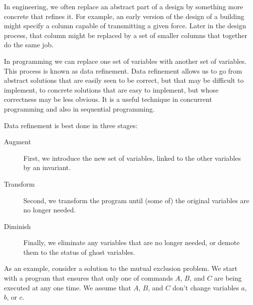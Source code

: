 \documentclass[muchmore,11pt]{article}%
\begin{document}
In engineering, we often replace an abstract part of a design by something
more concrete that refines it. For example, an early version of the design of
a building might specify a column capable of transmitting a given force. Later
in the design process, that column might be replaced by a set of smaller
columns that together do the same job.

In programming we can replace one set of variables with another set of
variables. This process is known as data refinement. Data refinement allows us
to go from abstract solutions that are easily seen to be correct, but that may
be difficult to implement, to concrete solutions that are easy to implement,
but whose correctness may be less obvious. It is a useful technique in
concurrent programming and also in sequential programming.

Data refinement is best done in three stages:

\begin{description}
\item[Augment] First, we introduce the new set of variables, linked to the
other variables by an invariant.

\item[Transform] Second, we transform the program until (some of) the original
variables are no longer needed.

\item[Diminish] Finally, we eliminate any variables that are no longer needed,
or demote them to the status of ghost variables.
\end{description}

As an example, consider a solution to the mutual exclusion problem. We start
with a program that ensures that only one of commands $A$, $B$, and $C$ are
being executed at any one time. We assume that $A$, $B$, and $C$ don't change
variables $a$, $b$, or $c$.
\end{document}
